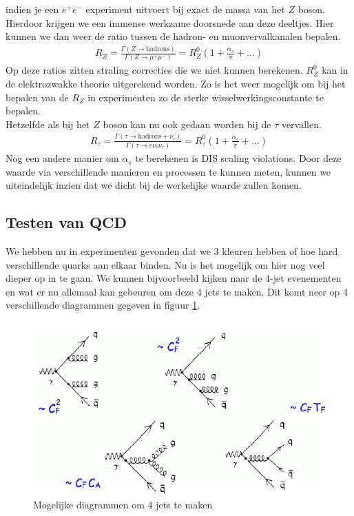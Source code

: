 \documentclass[../main.tex]{subfiles}
\begin{document}
indien je een $e^+e^-$ experiment uitvoert bij exact de massa van het $Z$ boson. Hierdoor krijgen we een immense werkzame doorsnede aan deze deeltjes. Hier kunnen we dan weer de ratio tussen de hadron- en muonvervalkanalen bepalen.
\begin{equation}
    \begin{aligned}
        \label{eq:hadr_z_boson}
        R_Z = \frac{\Gamma(Z\rightarrow \text{hadrons})}{\Gamma(Z\rightarrow \mu^+\mu^-)} = R_Z^0(1+ \frac{\alpha_s}{\pi} + ...)
    \end{aligned}
\end{equation}
Op deze ratios zitten straling correcties die we niet kunnen berekenen. $R_Z^0$ kan in de elektrozwakke theorie uitgerekend worden. Zo is het weer mogelijk om bij het bepalen van de $R_Z$ in experimenten zo de sterke wisselwerkingsconstante te bepalen.\\
Hetzelfde als bij het $Z$ boson kan nu ook gedaan worden bij de $\tau$ vervallen.
\begin{equation}
    \begin{aligned}
        \label{eq:hadr_tau}
        R_\tau = \frac{\Gamma(\tau\rightarrow \text{hadrons}+\nu_\tau)}{\Gamma(\tau\rightarrow e\nu_e\nu_\tau)} = R_\tau^0(1+ \frac{\alpha_s}{\pi} + ...)
    \end{aligned}
\end{equation}
Nog een andere manier om $\alpha_s$ te berekenen is DIS scaling violations. Door deze waarde via verschillende manieren en processen te kunnen meten, kunnen we uiteindelijk inzien dat we dicht bij de werkelijke waarde zullen komen.

\subsection{Testen van QCD}%
\label{sub:testen_van_qcd}

We hebben nu in experimenten gevonden dat we 3 kleuren hebben of hoe hard verschillende quarks aan elkaar binden. Nu is het mogelijk om hier nog veel dieper op in te gaan. We kunnen bijvoorbeeld kijken naar de 4-jet evenementen en wat er nu allemaal kan gebeuren om deze 4 jets te maken. Dit komt neer op 4 verschillende diagrammen gegeven in figuur \ref{fig:4jets}.

\begin{figure}[h]
    \centering
    \includegraphics[width=0.8\linewidth]{QCD/4jets.png}
    \caption{Mogelijke diagrammen om 4 jets te maken}%
    \label{fig:4jets}
\end{figure}
\end{document}
